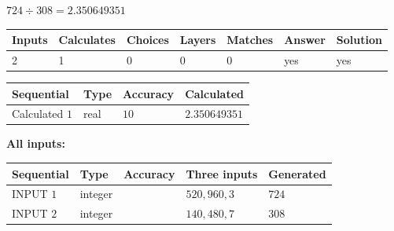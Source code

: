 \documentclass{ctexart}
\begin{document}
 

$ %
724 \div  %
308=   %
2.350649351$
 
 
\noindent{}
 
 

 
   
   
   
   
\noindent\begin{tabular}{|l|l|l|l|l|l|l|}
 \hline
Inputs & Calculates & Choices & Layers & Matches & Answer & Solution \\ \hline
 2  & 
 1  & 
 0
  & 
 0  & 
 0  & 
  yes & 
  yes 
  \\ \hline
 \end{tabular}
   
   
   
   
\noindent{}
   
   
  
  
\noindent\begin{tabular}{|l|l|l|l|}
\hline
 Sequential & Type & Accuracy & Calculated \\ 
\hline
 
 
  Calculated $  1 $ & real & $  10  $ & 
 $ 2.350649351 $ 
 \\  \hline  
 \end{tabular}
   
   
   
   
\noindent\vspace{0.1in}\hspace{-0.08in} {\textbf{\Large{All inputs: }}}
   
   
  
  
\noindent\begin{tabular}{|l|l|l|l|l|}
\hline
 Sequential & Type & Accuracy & Three inputs & Generated \\ 
\hline
 
 
  INPUT $  1 $ & integer &  & $
 520
 , 
 960
 , 
 3
 $ & $ 724 $ 
 \\  \hline  
 
 
  INPUT $  2 $ & integer &  & $
 140
 , 
 480
 , 
 7
 $ & $ 308 $ 
 \\  \hline  
 \end{tabular}
   
   
  
\vspace{0.2in}
  
\end{document}
